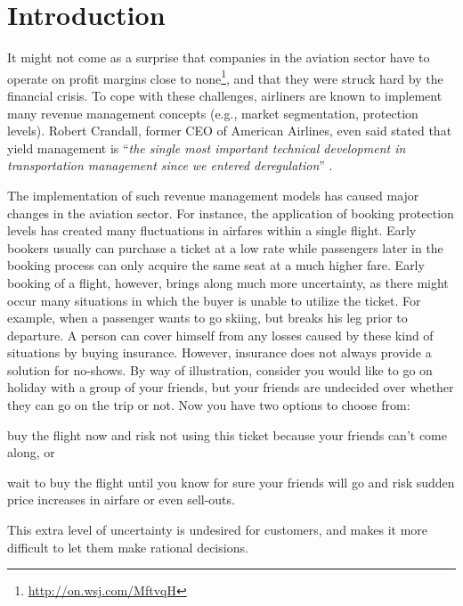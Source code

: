\chapter{Introduction}
\label{chap:Introduction}

It might not come as a surprise that companies in the aviation sector have to operate on profit margins close to none\footnote{\url{http://on.wsj.com/MftvqH}}, and that they were struck hard by the financial crisis. To cope with these challenges, airliners are known to implement many revenue management concepts (e.g., market segmentation, protection levels). Robert Crandall, former CEO of American Airlines, even said stated that yield management is ``\emph{the single most important technical development in transportation management since we entered deregulation}'' \cite[p.~30]{cross97}.

The implementation of such revenue management models has caused major changes in the aviation sector. For instance, the application of booking protection levels has created many fluctuations in airfares within a single flight. Early bookers usually can purchase a ticket at a low rate while passengers later in the booking process can only acquire the same seat at a much higher fare. Early booking of a flight, however, brings along much more uncertainty, as there might occur many situations in which the buyer is unable to utilize the ticket. For example, when a passenger wants to go skiing, but breaks his leg prior to departure. A person can cover himself from any losses caused by these kind of situations by buying insurance. However, insurance does not always provide a solution for no-shows. By way of illustration, consider you would like to go on holiday with a group of your friends, but your friends are undecided over whether they can go on the trip or not. Now you have two options to choose from:
\begin{compactitem}
    \item buy the flight now and risk not using this ticket because your friends can't come along, or
    \item wait to buy the flight until you know for sure your friends will go and risk sudden price increases in airfare or even sell-outs.
\end{compactitem}
\noindent
This extra level of uncertainty is undesired for customers, and makes it more difficult to let them make rational decisions.

